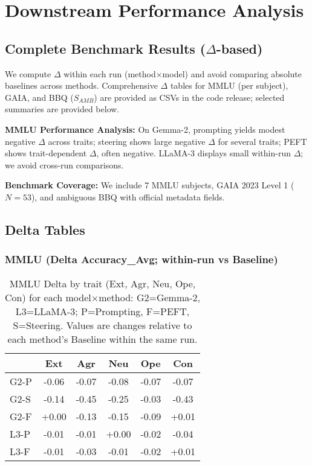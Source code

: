 \section{Downstream Performance Analysis}
\label{app:downstream-analysis}

\subsection{Complete Benchmark Results (\(\Delta\)-based)}

We compute \(\Delta\) within each run (method×model) and avoid comparing absolute baselines across methods. Comprehensive \(\Delta\) tables for MMLU (per subject), GAIA, and BBQ (\(S_{AMB}\)) are provided as CSVs in the code release; selected summaries are provided below.

\textbf{MMLU Performance Analysis:} On Gemma-2, prompting yields modest negative \(\Delta\) across traits; steering shows large negative \(\Delta\) for several traits; PEFT shows trait-dependent \(\Delta\), often negative. LLaMA-3 displays small within-run \(\Delta\); we avoid cross-run comparisons.

\textbf{Benchmark Coverage:} We include 7 MMLU subjects, GAIA 2023 Level 1 (\(N=53\)), and ambiguous BBQ with official metadata fields.

\subsection{Delta Tables}
\FloatBarrier

\subsubsection{MMLU (Delta Accuracy\_Avg; within-run vs Baseline)}
\begin{table}[H]
\centering
\scriptsize
{\setlength{\tabcolsep}{2pt}\renewcommand{\arraystretch}{0.95}%
\begin{adjustbox}{max width=\linewidth}
\begin{tabular}{lSSSSS}
\toprule
& {Ext} & {Agr} & {Neu} & {Ope} & {Con} \\
\midrule
G2-P & -0.06 & -0.07 & -0.08 & -0.07 & -0.07 \\
G2-S & -0.14 & -0.45 & -0.25 & -0.03 & -0.43 \\
G2-F & +0.00 & -0.13 & -0.15 & -0.09 & +0.01 \\
L3-P & -0.01 & -0.01 & +0.00 & -0.02 & -0.04 \\
L3-F & -0.01 & -0.03 & -0.01 & -0.02 & +0.01 \\
\bottomrule
\end{tabular}
\end{adjustbox}}
\caption{MMLU Delta by trait (Ext, Agr, Neu, Ope, Con) for each model×method: G2=Gemma-2, L3=LLaMA-3; P=Prompting, F=PEFT, S=Steering. Values are changes relative to each method's Baseline within the same run.}
\label{tab:delta-mmlu}
\end{table}
\FloatBarrier


